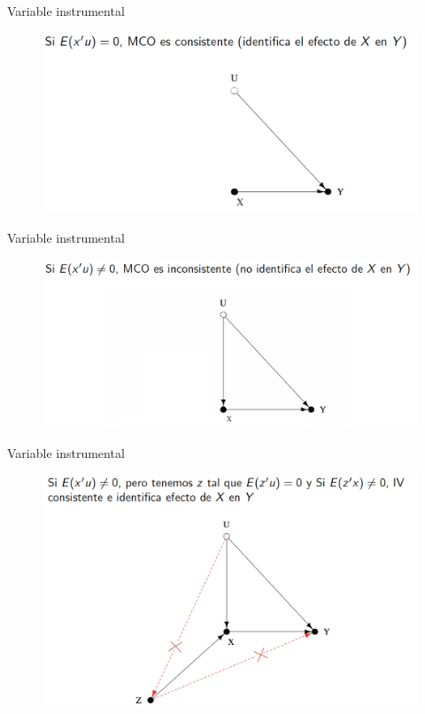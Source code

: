 \begin{frame}{Variable instrumental}
	\begin{figure}[H]
		\begin{centering}
			\includegraphics[scale=0.25]{fig/fig1.png}
		\end{centering}
	\end{figure}
\end{frame}
\begin{frame}{Variable instrumental}
	\begin{figure}[H]
		\begin{centering}
			\includegraphics[scale=0.25]{fig/fig2.png}
		\end{centering}
	\end{figure}
\end{frame}
\begin{frame}{Variable instrumental}
	\begin{figure}[H]
		\begin{centering}
			\includegraphics[scale=0.25]{fig/fig3.png}
		\end{centering}
	\end{figure}
\end{frame}
